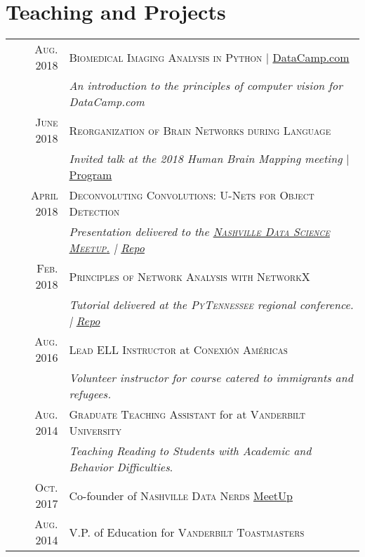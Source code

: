 \documentclass[a4paper,11pt]{article}
\begin{document}
\section{Teaching and Projects}
\begin{longtable}{rp{11cm}}
    \textsc{Aug.} 2018 & \textsc{Biomedical Imaging Analysis in Python} | \href{https://www.datacamp.com/courses/biomedical-image-analysis-in-python}{DataCamp.com} \\
    & \small{\emph{An introduction to the principles of computer vision for DataCamp.com}} \smallskip \\

    \textsc{June} 2018 & \textsc{Reorganization of Brain Networks during Language} \\
    & \small{\emph{Invited talk at the 2018 Human Brain Mapping meeting} | \href{https://ww5.aievolution.com/hbm1801/index.cfm?do=ev.viewEv&ev=1362}{Program}} \smallskip \\

    \textsc{April} 2018 & \textsc{Deconvoluting Convolutions: U-Nets for Object Detection}\\
    & \small{\emph{Presentation delivered to the \href{https://www.meetup.com/Data-Science-Nashville/events/249853957/}{\textsc{Nashville Data Science Meetup}.} | \href{https://github.com/stkbailey/deconv-conv)}{Repo}}} \smallskip \\

    \textsc{Feb.} 2018 & \textsc{Principles of Network Analysis with NetworkX}\\
    & \small{\emph{Tutorial delivered at the \textsc{PyTennessee} regional conference. | \href{https://github.com/stkbailey/nashnetx/presentations}{Repo}}}  \smallskip\\

    \textsc{Aug. 2016} & \textsc{Lead ELL Instructor} at \textsc{Conexi\'on Am\'ericas} \\
    & \small{\emph{Volunteer instructor for course catered to immigrants and refugees.}} \\ 
    
    \textsc{Aug. 2014} & \textsc{Graduate Teaching Assistant} for at \textsc{Vanderbilt University} \\
    & \small{\emph{Teaching Reading to Students with Academic and Behavior Difficulties}.} \\ 
    
    \textsc{Oct.} 2017 & Co-founder of \textsc{Nashville Data Nerds} \href{https://www.meetup.com/Data-Nerds/}{MeetUp} \smallskip \\

    \textsc{Aug. 2014} & V.P. of Education for \textsc{Vanderbilt Toastmasters} \smallskip \\
    
\end{longtable}
\end{document}
